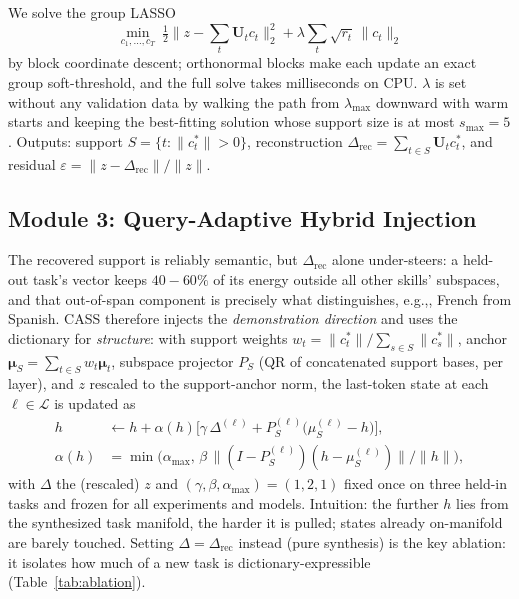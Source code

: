 \documentclass[sigconf,review,anonymous]{acmart}
\newcommand{\method}{\textsc{CASS}}
\newcommand{\eg}{e.g.,}
\begin{document}
We solve the group LASSO
\begin{equation}
\min_{c_1,\dots,c_T}\ \tfrac12\Big\|z-\sum_t \mathbf U_t c_t\Big\|_2^2
+\lambda\sum_t\sqrt{r_t}\,\|c_t\|_2
\label{eq:glasso}
\end{equation}
by block coordinate descent; orthonormal blocks make each update an exact
group soft-threshold, and the full solve takes milliseconds on CPU.
$\lambda$ is set without any validation data by walking the path from
$\lambda_{\max}$ downward with warm starts and keeping the best-fitting
solution whose support size is at most $s_{\max}{=}5$. Outputs: support
$S=\{t:\|c_t^*\|>0\}$, reconstruction
$\Delta_{\text{rec}}=\sum_{t\in S}\mathbf U_t c_t^*$, and residual
$\varepsilon=\|z-\Delta_{\text{rec}}\|/\|z\|$.

\subsection{Module 3: Query-Adaptive Hybrid Injection}
\label{sec:injection}
The recovered support is reliably semantic, but $\Delta_{\text{rec}}$ alone
under-steers: a held-out task's vector keeps $40{-}60\%$ of its energy
outside all other skills' subspaces, and that out-of-span component is
precisely what distinguishes, \eg, French from Spanish. \method{} therefore
injects the \emph{demonstration direction} and uses the dictionary for
\emph{structure}: with support weights
$w_t=\|c_t^*\|/\sum_{s\in S}\|c_s^*\|$, anchor
$\boldsymbol\mu_S=\sum_{t\in S}w_t\boldsymbol\mu_t$, subspace projector
$P_S$ (QR of concatenated support bases, per layer), and $z$ rescaled to the
support-anchor norm, the last-token state at each $\ell\in\mathcal L$ is
updated as
\begin{equation}
\begin{aligned}
h &\leftarrow h+\alpha(h)\big[\gamma\,\Delta^{(\ell)}
+P_S^{(\ell)}\big(\mu_S^{(\ell)}-h\big)\big],\\
\alpha(h)&=\min\!\Big(\alpha_{\max},\,
\beta\,\|(I-P_S^{(\ell)})(h-\mu_S^{(\ell)})\|/\|h\|\Big),
\end{aligned}
\label{eq:inject}
\end{equation}
with $\Delta$ the (rescaled) $z$ and $(\gamma,\beta,\alpha_{\max})=(1,2,1)$
fixed once on three held-in tasks and frozen for all experiments and models.
Intuition: the further $h$ lies from the synthesized task manifold, the harder
it is pulled; states already on-manifold are barely touched. Setting
$\Delta=\Delta_{\text{rec}}$ instead (pure synthesis) is the key ablation: it
isolates how much of a new task is dictionary-expressible
(Table~\ref{tab:ablation}).
\end{document}
